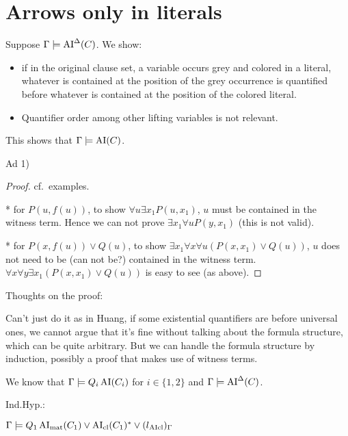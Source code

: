 \documentclass[,%
	paper=a4,%
	DIV10, %
	twoside=false,%
	liststotoc,
	bibtotoc,
	draft=false,%
	numbers=noendperiod
]{scrartcl}
\begin{document}
\section*{Arrows only in literals}

Suppose $\Gamma \models \operatorname{AI}^\Delta(C)$.
We show:
\begin{itemize}
		\item if in the original clause set, a variable occurs grey and colored in a literal, whatever is contained at the position of the grey occurrence is quantified before whatever is contained at the position of the colored literal.
	
	\item[\circled{2}] Quantifier order among other lifting variables is not relevant.
\end{itemize}
This shows that $\Gamma \models \operatorname{AI}(C)$. 

Ad 1)

\begin{cprop}
\end{cprop}
\begin{proof}
	cf.~examples.

	* for $P(u, f(u))$, to show $\forall u \exists x_1 P(u, x_1)$, $u$ must be contained in the witness term.
	Hence we can not prove $\exists x_1 \forall u P(y, x_1)$ (this is not valid).

	* for $P(x, f(u)) \lor Q(u)$, to show $\exists x_1 \forall x \forall u (P(x, x_1) \lor Q(u))$, $u$ does not need to be (can not be?) contained in the witness term.
	$\forall x \forall y \exists x_1 (P(x, x_1) \lor Q(u))$ is easy to see (as above).
\end{proof}

Thoughts on the proof:

Can't just do it as in Huang, if some existential quantifiers are before universal ones, we cannot argue that it's fine without talking about the formula structure, which can be quite arbitrary. 
But we can handle the formula structure by induction, possibly a proof that makes use of witness terms. 

We know that $\Gamma \models Q_i \operatorname{AI}(C_i)$ for $i\in\{1,2\}$ and $\Gamma \models \operatorname{AI}^\Delta(C)$.

\newcommand{\clauseOnePrime}{\AIclause(C_1)^*}
\newcommand{\clauseTwoPrime}{\AIclause(C_2)^*}

Ind.Hyp.:

$\Gamma \entails Q_1 \AImatrix(C_1) \lor \clauseOnePrime \lor {(l{\fromclause})_\Gamma}$
\end{document}
